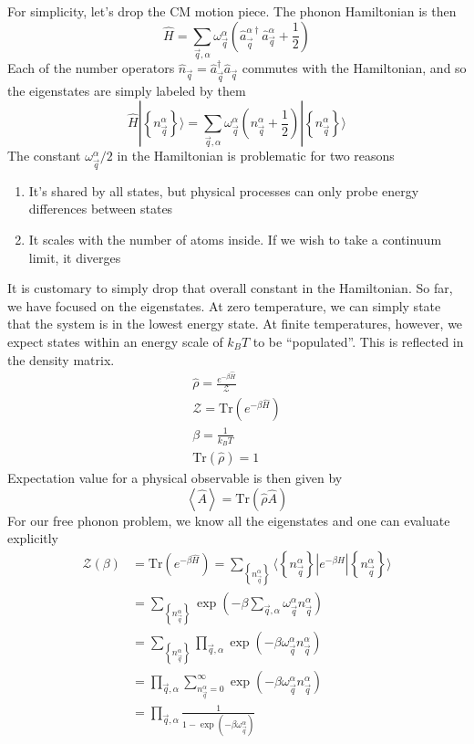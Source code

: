For simplicity, let's drop the CM motion piece. The phonon Hamiltonian is then
\[ \hat{H}=\sum_{\vec{q},\alpha}{\omega _{\vec{q}}^{\alpha}\left( \hat{a}_{\vec{q}}^{\alpha \dagger}\hat{a}_{\vec{q}}^{\alpha}+\frac{1}{2} \right)}\]
Each of the number operators $\hat{n}_{\vec{q}}=\hat{a}_{\vec{q}}^\dagger \hat{a}_{\vec{q}}$ commutes with the Hamiltonian, and so the eigenstates are simply labeled by them
\[ \hat{H}|\left\{ n_{\vec{q}}^{\alpha} \right\} \rangle =\sum_{\vec{q},\alpha}{\omega _{\vec{q}}^{\alpha}\left( n_{\vec{q}}^{\alpha}+\frac{1}{2} \right)}|\left\{ n_{\vec{q}}^{\alpha} \right\} \rangle \]
The constant $\omega_{\vec{q}}^\alpha/2$ in the Hamiltonian is problematic for two reasons
\begin{enumerate}
    \item It's shared by all states, but physical processes can only probe energy differences between states
    \item It scales with the number of atoms inside. If we wish to take a continuum limit, it diverges
\end{enumerate}
It is customary to simply drop that overall constant in the Hamiltonian. So far, we have focused on the eigenstates. At zero temperature, we can simply state that the system is in the lowest energy state. At finite temperatures, however, we expect states within an energy scale of $k_BT$ to be ``populated''. This is reflected in the density matrix.
\begin{gather*}
    \hat{\rho}=\frac{e^{-\beta \hat{H}}}{\mathcal{Z}}\\
    \mathcal{Z} =\mathrm{Tr}\left( e^{-\beta \hat{H}} \right) \\
    \beta =\frac{1}{k_BT}\\
    \mathrm{Tr}\left( \hat{\rho} \right) =1
\end{gather*}
Expectation value for a physical observable is then given by
\[ \left< \hat{A} \right> =\mathrm{Tr}\left( \hat{\rho}\hat{A} \right)  \]
For our free phonon problem, we know all the eigenstates and one can evaluate explicitly
\begin{align*}
    \mathcal{Z} \left( \beta \right) &=\mathrm{Tr}\left( e^{-\beta \hat{H}} \right) =\sum_{\left\{ n_{\vec{q}}^{\alpha} \right\}}{\langle \left\{ n_{\vec{q}}^{\alpha} \right\} |e^{-\beta \hat{H}}|\left\{ n_{\vec{q}}^{\alpha} \right\} \rangle}\\
    &=\sum_{\left\{ n_{\vec{q}}^{\alpha} \right\}}{\exp \left( -\beta \sum_{\vec{q},\alpha}{\omega _{\vec{q}}^{\alpha}n_{\vec{q}}^{\alpha}} \right)}\\
    &=\sum_{\left\{ n_{\vec{q}}^{\alpha} \right\}}{\prod_{\vec{q},\alpha}{\exp \left( -\beta \omega _{\vec{q}}^{\alpha}n_{\vec{q}}^{\alpha} \right)}}\\
    &=\prod_{\vec{q},\alpha}{\sum_{n_{\vec{q}}^{\alpha}=0}^{\infty}{\exp \left( -\beta \omega _{\vec{q}}^{\alpha}n_{\vec{q}}^{\alpha} \right)}}\\
    &=\prod_{\vec{q},\alpha}{\frac{1}{1-\exp \left( -\beta \omega _{\vec{q}}^{\alpha} \right)}}
\end{align*}
